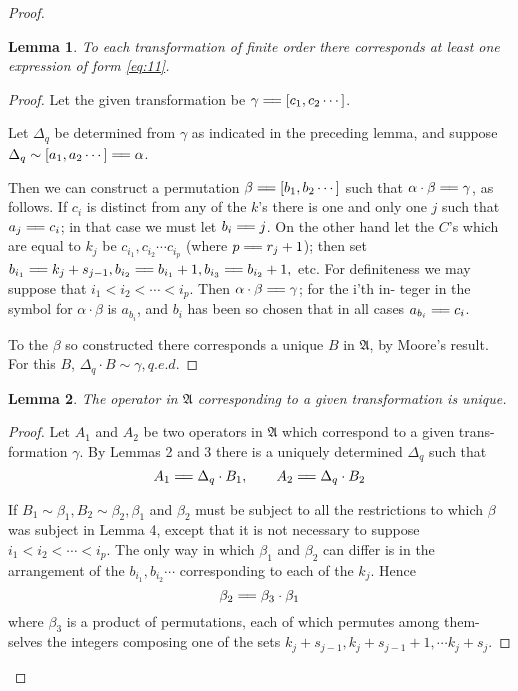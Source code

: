 \documentclass[9pt, twoside]{extarticle}
\newcommand{\td}[2][] {\todo[tickmarkheight=3pt, inline, size=\tiny, #1]{#2}}
\newcommand\longeq{=\joinrel=}
\newtheorem{lemma}{Lemma}
\begin{document}
\begin{proof}
\begin{lemma}
  To each transformation of finite order there corresponds at
  least one expression of form \eqref{eq:11}.
\end{lemma}
\begin{proof}
  Let the given transformation be \(\gamma \longeq [c_1, c_2 \cdots]\).

  Let \(\Delta_q\) be determined from \(\gamma\) as indicated in the preceding lemma, and
  suppose \(\Delta_q \sim [a_1, a_2 \cdots] \longeq \alpha\).

  Then we can construct a permutation \(\beta \longeq [b_1, b_2 \cdots]\) such that
  \(\alpha \cdot \beta \longeq \gamma\), as follows. If \(c_i\) is distinct from any of the \(k\)'s there is one and
  only one \(j\) such that \(a_j \longeq c_i\); in that case we must let \(b_i \longeq j\). On the other
  hand let the \(C\)'s which are equal to \(k_j\) be \(c_{i_1}, c_{i_2} \cdots c_{i_p}\) (where \(p \longeq r_j + 1\));
  then set \(b_{i_1} \longeq k_j + s_{j-1}, b_{i_2} \longeq b_{i_1} +1, b_{i_3} \longeq b_{i_2} +1,\) etc. For definiteness
  we may suppose that \(i_1 < i_2 < \cdots < i_p\). Then \(\alpha \cdot \beta \longeq \gamma\); for the i'th in-
  teger in the symbol for \(\alpha \cdot \beta\) is \(a_{b_i}\), and \(b_i\) has been so chosen that in all
  cases \(a_{b_i} \longeq c_i\).

  To the \(\beta\) so constructed there corresponds a unique \(B\) in \(\mathfrak{A}\), by Moore's
  result. For this \(B\), \(\Delta_q \cdot B \sim \gamma, q.e.d.\)
\end{proof}

\begin{lemma}
  The operator in \(\mathfrak{A}\) corresponding to a given transformation
  is unique.
\end{lemma}
\begin{proof}
  Let \(A_1\) and \(A_2\) be two operators in \(\mathfrak{A}\) which correspond to a given trans-
  \td{label/ref lemmas}
  formation \(\gamma\). By Lemmas 2 and 3 there is a uniquely determined \(\Delta_q\)
  such that
  \[A_1 \longeq \Delta_q \cdot B_1, \qquad A_2 \longeq \Delta_q \cdot B_2\]

  If \(B_1 \sim \beta_1, B_2 \sim \beta_2, \beta_1\) and \(\beta_2\) must be subject to all the restrictions
  to which \(\beta\) was subject in Lemma 4, except that it is not necessary to suppose
  \(i_1 < i_2 < \cdots < i_p\). The only way in which \(\beta_1\) and \(\beta_2\) can differ is in the
  arrangement of the \(b_{i_1}, b_{i_2} \cdots\) corresponding to each of the \(k_j\). Hence
  \[\beta_2 \longeq \beta_3 \cdot \beta_1\]
  where \(\beta_3\) is a product of permutations, each of which permutes among them-
  selves the integers composing one of the sets \(k_j + s_{j-1}, k_j + s_{j-1} + 1, \cdots k_j + s_j\).


\end{proof}
\end{proof}
\end{document}
